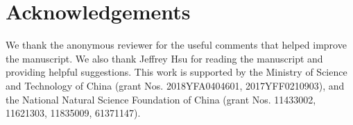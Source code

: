 \documentclass[fleqn,usenatbib]{mnras}
\begin{document}
\section*{Acknowledgements}

We thank the anonymous reviewer for the useful comments that helped
improve the manuscript.
We also thank Jeffrey Hsu for reading the manuscript and providing
helpful suggestions.
This work is supported by
the Ministry of Science and Technology of China
(grant Nos. 2018YFA0404601, 2017YFF0210903),
and the National Natural Science Foundation of China
(grant Nos. 11433002, 11621303, 11835009, 61371147).










\bsp	%
\label{lastpage}
\end{document}
